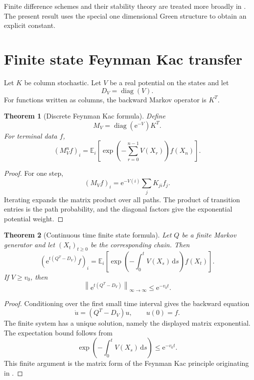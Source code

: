 \documentclass[11pt,a4paper]{article}
\newtheorem{theorem}{Theorem}[section]
\theoremstyle{definition}
\theoremstyle{remark}
\newcommand{\Exp}{\mathbb E}
\newcommand{\diag}{\operatorname{diag}}
\newcommand{\norm}[1]{\left\lVert#1\right\rVert}
\newcommand{\e}{\mathrm e}
\newcommand{\dd}{\,\mathrm d}
\begin{document}
Finite difference schemes and their stability theory are treated more broadly in \cite{Strikwerda2004}. The present result uses the special one dimensional Green structure to obtain an explicit constant.

\section{Finite state Feynman Kac transfer}\label{extended:section:13}\label{extended:sec:feynman_kac}

Let \(K\) be column stochastic. Let \(V\) be a real potential on the states and let
\[
D_V=\diag(V).
\]
For functions written as columns, the backward Markov operator is \(K^T\).

\begin{theorem}[Discrete Feynman Kac formula]\label{extended:record:081}\label{extended:thm:discrete_feynman_kac}
Define
\[
M_V=\diag(\e^{-V})K^T.
\]
For terminal data \(f\),
\[
(M_V^nf)_i
=
\Exp_i\left[
\exp\left(
-\sum_{r=0}^{n-1}V(X_r)
\right)
f(X_n)
\right].
\]
\end{theorem}

\begin{proof}
For one step,
\[
(M_Vf)_i
=
\e^{-V(i)}\sum_jK_{ji}f_j.
\]
Iterating expands the matrix product over all paths. The product of transition entries is the path probability, and the diagonal factors give the exponential potential weight.
\end{proof}

\begin{theorem}[Continuous time finite state formula]\label{extended:record:082}\label{extended:thm:continuous_feynman_kac}
Let \(Q\) be a finite Markov generator and let \((X_t)_{t\geq0}\) be the corresponding chain. Then
\[
\left(
\e^{t(Q^T-D_V)}f
\right)_i
=
\Exp_i\left[
\exp\left(
-\int_0^tV(X_s)\dd s
\right)
f(X_t)
\right].
\]
If \(V\geq v_0\), then
\[
\norm{\e^{t(Q^T-D_V)}}_{\infty\to\infty}
\leq
\e^{-v_0t}.
\]
\end{theorem}

\begin{proof}
Conditioning over the first small time interval gives the backward equation
\[
\dot u=(Q^T-D_V)u,
\qquad
u(0)=f.
\]
The finite system has a unique solution, namely the displayed matrix exponential. The expectation bound follows from
\[
\exp\left(-\int_0^tV(X_s)\dd s\right)
\leq
\e^{-v_0t}.
\]
This finite argument is the matrix form of the Feynman Kac principle originating in \cite{Kac1949}.
\end{proof}
\end{document}
